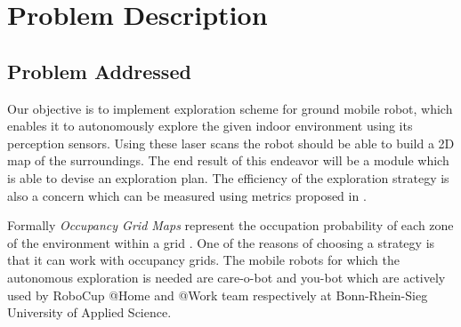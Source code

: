 \section{Problem Description}

\subsection{Problem Addressed}
Our objective is to implement exploration scheme for ground mobile robot, which enables it to
autonomously explore the given indoor environment using its perception sensors.
Using these laser scans the robot should be able to build a 2D map of the surroundings.
The end result of this endeavor will be a module which is able to devise an exploration plan.
The efficiency of the exploration strategy is also a concern which can be measured using metrics
proposed in \cite{Yan2015}.
\par
Formally \textit{Occupancy Grid Maps} represent the occupation probability of each zone of the
environment within a grid \cite{Juliae2012}. One of the reasons of choosing a strategy is that
it can work with occupancy grids. The mobile robots for which the autonomous exploration is needed
are care-o-bot and you-bot which are actively used by RoboCup @Home and @Work team respectively at
Bonn-Rhein-Sieg University of Applied Science.

